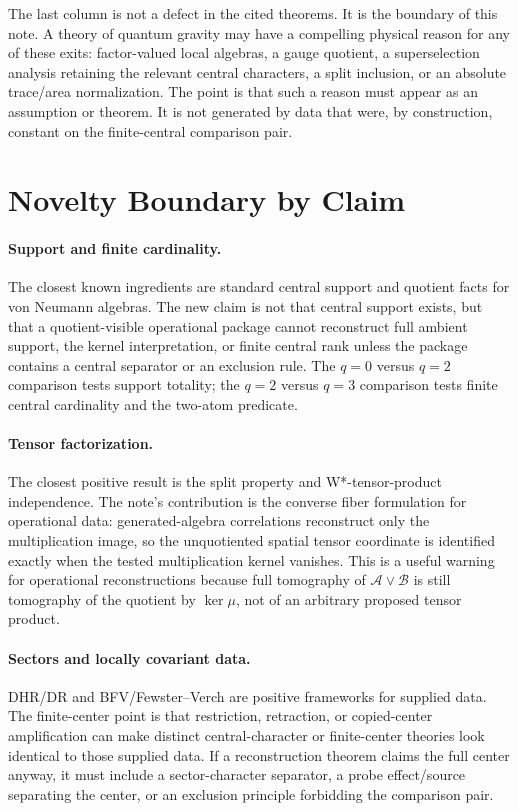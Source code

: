 \documentclass[12pt]{article}
\theoremstyle{definition}
\theoremstyle{remark}
\newcommand{\A}{\mathcal A}
\newcommand{\B}{\mathcal B}
\begin{document}
The last column is not a defect in the cited theorems.  It is the boundary of
this note.  A theory of quantum gravity may have a compelling physical reason
for any of these exits: factor-valued local algebras, a gauge quotient, a
superselection analysis retaining the relevant central characters, a split
inclusion, or an absolute trace/area normalization.  The point is that such a
reason must appear as an assumption or theorem.  It is not generated by data
that were, by construction, constant on the finite-central comparison pair.

\section{Novelty Boundary by Claim}

\paragraph{Support and finite cardinality.}
The closest known ingredients are standard central support and quotient facts
for von Neumann algebras.  The new claim is not that central support exists, but
that a quotient-visible operational package cannot reconstruct full ambient
support, the kernel interpretation, or finite central rank unless the package
contains a central separator or an exclusion rule.  The \(q=0\) versus
\(q=2\) comparison tests support totality; the \(q=2\) versus \(q=3\)
comparison tests finite central cardinality and the two-atom predicate.

\paragraph{Tensor factorization.}
The closest positive result is the split property and W*-tensor-product
independence.  The note's contribution is the converse fiber formulation for
operational data: generated-algebra correlations reconstruct only the
multiplication image, so the unquotiented spatial tensor coordinate is
identified exactly when the tested multiplication kernel vanishes.  This is a
useful warning for operational reconstructions because full tomography of
\(\A\vee\B\) is still tomography of the quotient by \(\ker\mu\), not of an
arbitrary proposed tensor product.

\paragraph{Sectors and locally covariant data.}
DHR/DR and BFV/Fewster--Verch are positive frameworks for supplied data.  The
finite-center point is that restriction, retraction, or copied-center
amplification can make distinct central-character or finite-center theories
look identical to those supplied data.  If a reconstruction theorem claims the
full center anyway, it must include a sector-character separator, a probe
effect/source separating the center, or an exclusion principle forbidding the
comparison pair.
\end{document}
